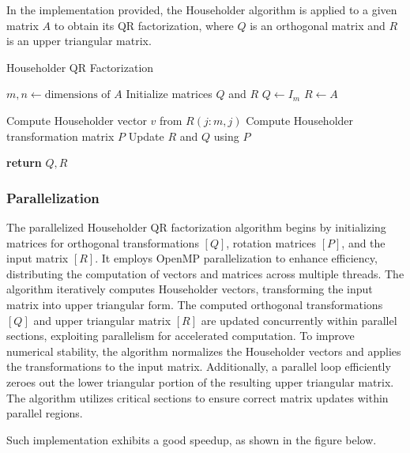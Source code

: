 \documentclass{article}
\begin{document}
In the implementation provided, the Householder algorithm is applied to a given matrix $A$ to obtain its QR factorization, where $Q$ is an orthogonal matrix and $R$ is an upper triangular matrix.

\begin{algorithm}
\caption{Householder QR Factorization}
\begin{algorithmic}[1]
    \State $m, n \gets \text{dimensions of } A$
    \State Initialize matrices $Q$ and $R$
    \State $Q \gets I_m$ 
    \State $R \gets A$
    
        \State Compute Householder vector $v$ from $R(j:m, j)$
        \State Compute Householder transformation matrix $P$
        \State Update $R$ and $Q$ using $P$
    \EndFor
    
    \State \textbf{return} $Q, R$
\EndProcedure
\end{algorithmic}
\end{algorithm}


\subsubsection{Parallelization}
The parallelized Householder QR factorization algorithm begins by initializing matrices for orthogonal transformations \([Q]\), rotation matrices \([P]\), and the input matrix \([R]\). It employs OpenMP parallelization to enhance efficiency, distributing the computation of vectors and matrices across multiple threads. The algorithm iteratively computes Householder vectors, transforming the input matrix into upper triangular form. The computed orthogonal transformations \([Q]\) and upper triangular matrix \([R]\) are updated concurrently within parallel sections, exploiting parallelism for accelerated computation. To improve numerical stability, the algorithm normalizes the Householder vectors and applies the transformations to the input matrix. Additionally, a parallel loop efficiently zeroes out the lower triangular portion of the resulting upper triangular matrix. The algorithm utilizes critical sections to ensure correct matrix updates within parallel regions.

Such implementation exhibits a good speedup, as shown in the figure below.
\end{document}
